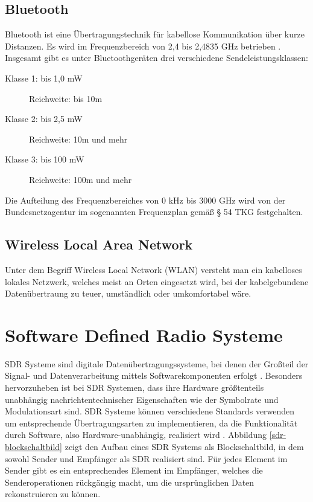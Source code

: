 \subsection{Bluetooth}
Bluetooth ist eine Übertragungstechnik für kabellose Kommunikation über kurze Distanzen. Es wird im Frequenzbereich von 2,4 bis 2,4835 GHz betrieben \cite[Bundesamt für Strahlenschutz, S. 1]{bundesamt-strahlungsschutz:2012}. Insgesamt gibt es unter Bluetoothgeräten drei verschiedene Sendeleistungsklassen:
\begin{description}
	\item[Klasse 1: bis 1,0 mW] Reichweite: bis 10m 
	\item [Klasse 2: bis 2,5 mW] Reichweite: 10m und mehr
	\item [Klasse 3: bis 100 mW] Reichweite: 100m und mehr
\end{description}
Die Aufteilung des Frequenzbereiches von 0 kHz bis 3000 GHz wird von der Bundesnetzagentur im sogenannten Frequenzplan \cite[Bundesnetzagentur]{bundesnetzagentur-frequenzplan:2016} gemäß § 54 TKG festgehalten.





\subsection{Wireless Local Area Network}
Unter dem Begriff Wireless Local Network (WLAN) versteht man ein kabelloses lokales Netzwerk, welches meist an Orten eingesetzt wird, bei der kabelgebundene Datenübertraung zu teuer, umständlich oder umkomfortabel wäre.






\section{Software Defined Radio Systeme} 
\ac{SDR} Systeme sind digitale Datenübertragungssysteme, bei denen der Großteil der Signal- und Datenverarbeitung mittels Softwarekomponenten erfolgt \cite[Heuberger, e. a., S. 1]{Heuberger:2017}.
Besonders hervorzuheben ist bei \ac{SDR} Systemen, dass ihre Hardware größtenteils unabhängig nachrichtentechnischer Eigenschaften wie der Symbolrate und Modulationsart sind. \ac{SDR} Systeme können verschiedene Standards verwenden um entsprechende Übertragungsarten zu implementieren, da die Funktionalität durch Software, also Hardware-unabhängig, realisiert wird \cite[Heuberger, e. a., S. 36]{Heuberger:2017}. \newline
Abbildung \ref{sdr-blockschaltbild} zeigt den Aufbau eines \ac{SDR} Systems als Blockschaltbild, in dem sowohl Sender und Empfänger als SDR realisiert sind.
Für jedes Element im Sender gibt es ein entsprechendes Element im Empfänger, welches die Senderoperationen rückgängig macht, um die ursprünglichen Daten rekonstruieren zu können.

